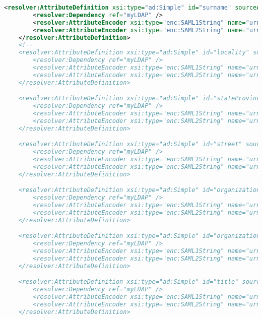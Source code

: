 \begin{lstlisting}[language=xml]
    <resolver:AttributeDefinition xsi:type="ad:Simple" id="surname" sourceAttributeID="sn">
        <resolver:Dependency ref="myLDAP" />
        <resolver:AttributeEncoder xsi:type="enc:SAML1String" name="urn:mace:dir:attribute-def:sn" />
        <resolver:AttributeEncoder xsi:type="enc:SAML2String" name="urn:oid:2.5.4.4" friendlyName="sn" />
    </resolver:AttributeDefinition>
    <!--
    <resolver:AttributeDefinition xsi:type="ad:Simple" id="locality" sourceAttributeID="l">
        <resolver:Dependency ref="myLDAP" />
        <resolver:AttributeEncoder xsi:type="enc:SAML1String" name="urn:mace:dir:attribute-def:l" />
        <resolver:AttributeEncoder xsi:type="enc:SAML2String" name="urn:oid:2.5.4.7" friendlyName="l" />
    </resolver:AttributeDefinition>

    <resolver:AttributeDefinition xsi:type="ad:Simple" id="stateProvince" sourceAttributeID="st">
        <resolver:Dependency ref="myLDAP" />
        <resolver:AttributeEncoder xsi:type="enc:SAML1String" name="urn:mace:dir:attribute-def:st" />
        <resolver:AttributeEncoder xsi:type="enc:SAML2String" name="urn:oid:2.5.4.8" friendlyName="st" />
    </resolver:AttributeDefinition>

    <resolver:AttributeDefinition xsi:type="ad:Simple" id="street" sourceAttributeID="street">
        <resolver:Dependency ref="myLDAP" />
        <resolver:AttributeEncoder xsi:type="enc:SAML1String" name="urn:mace:dir:attribute-def:street" />
        <resolver:AttributeEncoder xsi:type="enc:SAML2String" name="urn:oid:2.5.4.9" friendlyName="street" />
    </resolver:AttributeDefinition>

    <resolver:AttributeDefinition xsi:type="ad:Simple" id="organizationName" sourceAttributeID="o">
        <resolver:Dependency ref="myLDAP" />
        <resolver:AttributeEncoder xsi:type="enc:SAML1String" name="urn:mace:dir:attribute-def:o" />
        <resolver:AttributeEncoder xsi:type="enc:SAML2String" name="urn:oid:2.5.4.10" friendlyName="o" />
    </resolver:AttributeDefinition>

    <resolver:AttributeDefinition xsi:type="ad:Simple" id="organizationalUnit" sourceAttributeID="ou">
        <resolver:Dependency ref="myLDAP" />
        <resolver:AttributeEncoder xsi:type="enc:SAML1String" name="urn:mace:dir:attribute-def:ou" />
        <resolver:AttributeEncoder xsi:type="enc:SAML2String" name="urn:oid:2.5.4.11" friendlyName="ou" />
    </resolver:AttributeDefinition>

    <resolver:AttributeDefinition xsi:type="ad:Simple" id="title" sourceAttributeID="title">
        <resolver:Dependency ref="myLDAP" />
        <resolver:AttributeEncoder xsi:type="enc:SAML1String" name="urn:mace:dir:attribute-def:title" />
        <resolver:AttributeEncoder xsi:type="enc:SAML2String" name="urn:oid:2.5.4.12" friendlyName="title" />
    </resolver:AttributeDefinition>


\end{lstlisting}
